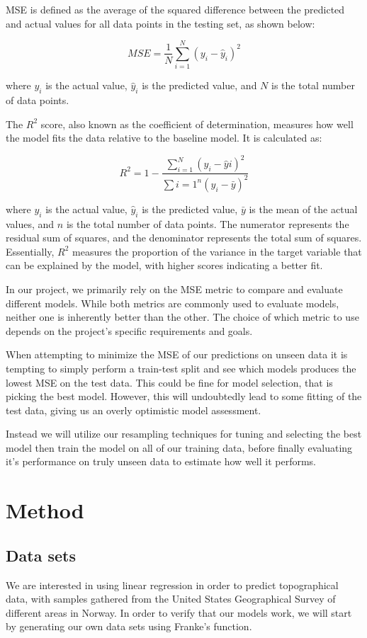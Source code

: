 \documentclass{article}
\begin{document}
MSE is defined as the average of the squared difference between the predicted and actual values for all data points in the testing set, as shown below:

$$MSE = \frac{1}{N}\sum_{i=1}^{N}(y_i - \hat{y}_i)^2$$

where $y_i$ is the actual value, $\hat{y}_i$ is the predicted value, and $N$ is the total number of data points.

The $R^2$ score, also known as the coefficient of determination, measures how well the model fits the data relative to the baseline model. It is calculated as:

$$R^2 = 1 - \frac{\sum_{i=1}^{N}(y_i - \hat{y}i)^2}{\sum{i=1}^{n}(y_i - \bar{y})^2}$$

where $y_i$ is the actual value, $\hat{y}_i$ is the predicted value, $\bar{y}$ is the mean of the actual values, and $n$ is the total number of data points. The numerator represents the residual sum of squares, and the denominator represents the total sum of squares. Essentially, $R^2$ measures the proportion of the variance in the target variable that can be explained by the model, with higher scores indicating a better fit.

In our project, we primarily rely on the MSE metric to compare and evaluate different models. While both metrics are commonly used to evaluate models, neither one is inherently better than the other. The choice of which metric to use depends on the project's specific requirements and goals.

When attempting to minimize the MSE of our predictions on unseen data it is tempting to simply perform a train-test split and see which models produces the lowest MSE on the test data. This could be fine for model selection, that is picking the best model. However, this will undoubtedly lead to some fitting of the test data, giving us an overly optimistic model assessment.

Instead we will utilize our resampling techniques for tuning and selecting the best model then train the model on all of our training data, before finally evaluating it's performance on truly unseen data to estimate how well it performs.

\newpage
\section{Method}
\subsection{Data sets}
We are interested in using linear regression in order to predict topographical data, with samples gathered from the United States Geographical Survey of different areas in Norway. In order to verify that our models work, we will start by generating our own data sets using Franke's function.
\end{document}
